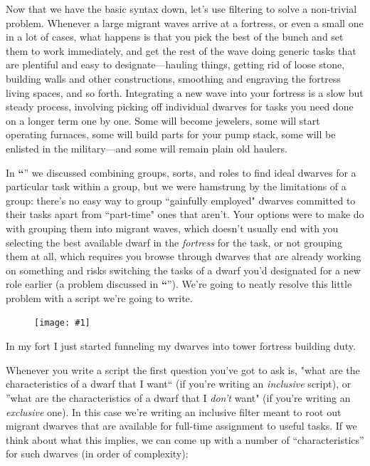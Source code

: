 \documentclass[]{article}
\newcommand{\jump}[1] {\textbf{``\nameref{sec:#1}}''}
\newcommand{\legacy}[1] {
\begin{center}
\colorbox{legacy-content}{
\begin{minipage}[t]{0.95\linewidth}
#1
\end{minipage}
}
\end{center}
}
\newcommand{\fullfigure}[1] {
\begin{figure}[h!]
\texttt{[image: \#1]}
\end{figure}
}
\newcommand{\fullfigurecaption}[1] {
\begin{center}
\vspace{-12pt}
#1
\end{center}
}
\begin{document}

Now that we have the basic syntax down, let's use filtering to solve a non-trivial problem. Whenever a
large migrant waves arrive at a fortress, or even a small one in a lot of cases, what happens is that you
pick the best of the bunch and set them to work immediately, and get the rest of the wave doing generic
tasks that are plentiful and easy to designate---hauling things, getting rid of loose stone, building
walls and other constructions, smoothing and engraving the fortress living spaces, and so forth.
Integrating a new wave into your fortress is a slow but steady process, involving picking off individual
dwarves for tasks you need done on a longer term one by one. Some will become jewelers, some will start
operating furnaces, some will build parts for your pump stack, some will be enlisted in the military---and some will remain plain old haulers.

In  \jump{Using Roles} we discussed combining groups, sorts, and roles to find ideal
dwarves for a particular task within a group, but we were hamstrung by the limitations of a group:
there's no easy way to group ``gainfully employed" dwarves committed to their tasks apart from
``part-time" ones that aren't. Your options were to make do with grouping them into migrant waves, which
doesn't usually end with you selecting the best available dwarf in the \emph{fortress} for the task, or
not grouping them at all, which requires you browse through dwarves that are already working on something
and risks switching the tasks of a dwarf you'd designated for a new role earlier (a problem discussed in
\jump{Assigning Nicknames}). We're going to neatly resolve this little problem with a
script we're going to write.

\fullfigure{Sec4Fig2}
\fullfigurecaption{In my fort I just started funneling my dwarves into tower fortress building duty.}

Whenever you write a script the first question you've got to ask is, "what are the characteristics of a
dwarf that I want`` (if you're writing an \emph{inclusive} script), or ''what are the characteristics of a
dwarf that I \emph{don't} want" (if you're writing an \emph{exclusive} one). In this case we're writing
an inclusive filter meant to root out migrant dwarves that are available for full-time assignment to
useful tasks. If we think about what this implies, we can come up with a number of ``characteristics'' for
such dwarves (in order of complexity):
\end{document}
